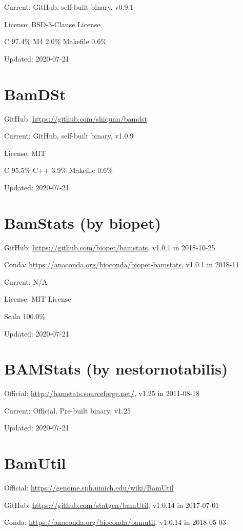 \documentclass[]{article}
\begin{document}
Current: GitHub, self-built binary, v0.9.1

License: BSD-3-Clause License

C 97.4\% M4 2.0\% Makefile 0.6\%

Updated: 2020-07-21

\section{BamDSt}

GitHub: \url{https://github.com/shiquan/bamdst}

Current: GitHub, self-built binary, v1.0.9

License: MIT

C 95.5\% C++ 3.9\% Makefile 0.6\%

Updated: 2020-07-21

\section{BamStats (by biopet)}

GitHub: \url{https://github.com/biopet/bamstats}, v1.0.1 in 2018-10-25

Conda: \url{https://anaconda.org/bioconda/biopet-bamstats}, v1.0.1 in 2018-11

Current: N/A

License: MIT License

Scala 100.0\%

Updated: 2020-07-21

\section{BAMStats (by nestornotabilis)}

Official: \url{http://bamstats.sourceforge.net/}, v1.25 in 2011-08-18

Current: Official, Pre-built binary, v1.25

Updated: 2020-07-21

\section{BamUtil}

Official: \url{https://genome.sph.umich.edu/wiki/BamUtil}

GitHub: \url{https://github.com/statgen/bamUtil}, v1.0.14 in 2017-07-01

Conda: \url{https://anaconda.org/bioconda/bamutil}, v1.0.14 in 2018-05-03
\end{document}
